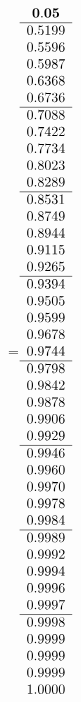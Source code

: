 =\hbox{$\begin{array}{c}
\bf 0.05 
 \\ \hline 
  0.5199 \\ 
  0.5596 \\ 
  0.5987 \\ 
  0.6368 \\ 
  0.6736
 \\ \hline 
  0.7088 \\ 
  0.7422 \\ 
  0.7734 \\ 
  0.8023 \\ 
  0.8289
 \\ \hline 
  0.8531 \\ 
  0.8749 \\ 
  0.8944 \\ 
  0.9115 \\ 
  0.9265
 \\ \hline 
  0.9394 \\ 
  0.9505 \\ 
  0.9599 \\ 
  0.9678 \\ 
  0.9744
 \\ \hline 
  0.9798 \\ 
  0.9842 \\ 
  0.9878 \\ 
  0.9906 \\ 
  0.9929
 \\ \hline 
  0.9946 \\ 
  0.9960 \\ 
  0.9970 \\ 
  0.9978 \\ 
  0.9984
 \\ \hline 
  0.9989 \\ 
  0.9992 \\ 
  0.9994 \\ 
  0.9996 \\ 
  0.9997
 \\ \hline 
  0.9998 \\ 
  0.9999 \\ 
  0.9999 \\ 
  0.9999 \\ 
  1.0000
 \end{array}$}
